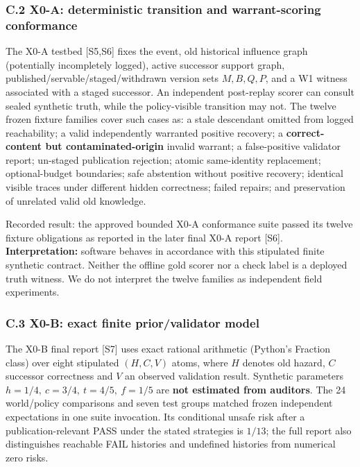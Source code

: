 \documentclass[
  10pt,
  american,
  a4paper,
]{article}
\begin{document}
\hypertarget{c.2-x0-a-deterministic-transition-and-warrant-scoring-conformance}{%
\subsubsection{C.2 X0-A: deterministic transition and warrant-scoring
conformance}\label{c.2-x0-a-deterministic-transition-and-warrant-scoring-conformance}}

The X0-A testbed {[}S5,S6{]} fixes the event, old historical influence
graph (potentially incompletely logged), active successor support graph,
published/servable/staged/withdrawn version sets \(M,B,Q,P\), and a W1
witness associated with a staged successor. An independent post-replay
scorer can consult sealed synthetic truth, while the policy-visible
transition may not. The twelve frozen fixture families cover such cases
as: a stale descendant omitted from logged reachability; a valid
independently warranted positive recovery; a \textbf{correct-content but
contaminated-origin} invalid warrant; a false-positive validator report;
un-staged publication rejection; atomic same-identity replacement;
optional-budget boundaries; safe abstention without positive recovery;
identical visible traces under different hidden correctness; failed
repairs; and preservation of unrelated valid old knowledge.

Recorded result: the approved bounded X0-A conformance suite passed its
twelve fixture obligations as reported in the later final X0-A report
{[}S6{]}. \textbf{Interpretation:} software behaves in accordance with
this stipulated finite synthetic contract. Neither the offline gold
scorer nor a check label is a deployed truth witness. We do not
interpret the twelve families as independent field experiments.

\hypertarget{c.3-x0-b-exact-finite-priorvalidator-model}{%
\subsubsection{C.3 X0-B: exact finite prior/validator
model}\label{c.3-x0-b-exact-finite-priorvalidator-model}}

The X0-B final report {[}S7{]} uses exact rational arithmetic (Python's
Fraction class) over eight stipulated \((H,C,V)\) atoms, where \(H\)
denotes old hazard, \(C\) successor correctness and \(V\) an observed
validation result. Synthetic parameters
\(h=1/4,\ c=3/4,\ t=4/5,\ f=1/5\) are \textbf{not estimated from
auditors}. The 24 world/policy comparisons and seven test groups matched
frozen independent expectations in one suite invocation. Its conditional
unsafe risk after a publication-relevant PASS under the stated
strategies is \(1/13\); the full report also distinguishes reachable
FAIL histories and undefined histories from numerical zero risks.
\end{document}
